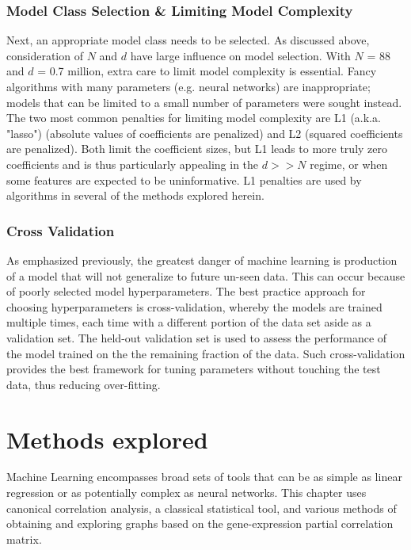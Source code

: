 \subsubsection{Model Class Selection \& Limiting Model Complexity}
Next, an appropriate model class needs to be selected.
As discussed above, consideration of $N$ and $d$ have large influence on model selection.
With $N$ = 88 and $d$ = 0.7 million, extra care to limit model complexity is essential.
Fancy algorithms with many parameters (e.g. neural networks) are inappropriate; models that can be limited to a small number of parameters were sought instead.
The two most common penalties for limiting model complexity are L1 (a.k.a. "lasso") \cite{tibshirani1996} (absolute values of coefficients are penalized) and L2 \cite{hoerl1970} (squared coefficients are penalized).
Both limit the coefficient sizes, but L1 leads to more truly zero coefficients \cite{tibshirani1996} and is thus particularly appealing in the $d >> N$ regime, or when some features are expected to be uninformative.
L1 penalties are used by algorithms in several of the methods explored herein.

\subsubsection{Cross Validation} %
As emphasized previously, the greatest danger of machine learning is production of a model that will not generalize to future un-seen data.
This can occur because of poorly selected model hyperparameters.
The best practice approach for choosing hyperparameters is cross-validation, whereby the models are trained multiple times, each time with a different portion of the data set aside as a validation set.
The held-out validation set is used to assess the performance of the model trained on the the remaining fraction of the data.
Such cross-validation provides the best framework for tuning parameters without touching the test data, thus reducing over-fitting.

\section{Methods explored}
Machine Learning encompasses broad sets of tools that can be as simple as linear regression or as potentially complex as neural networks.
This chapter uses canonical correlation analysis, a classical statistical tool, and various methods of obtaining and exploring graphs based on the gene-expression partial correlation matrix.

